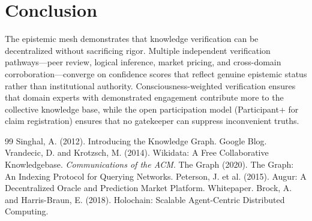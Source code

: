 \documentclass[11pt,twocolumn]{article}
\begin{document}
\section{Conclusion}

The epistemic mesh demonstrates that knowledge verification can be
decentralized without sacrificing rigor. Multiple independent verification
pathways---peer review, logical inference, market pricing, and cross-domain
corroboration---converge on confidence scores that reflect genuine epistemic
status rather than institutional authority. Consciousness-weighted verification
ensures that domain experts with demonstrated engagement contribute more to
the collective knowledge base, while the open participation model (Participant+
for claim registration) ensures that no gatekeeper can suppress inconvenient
truths.

\begin{thebibliography}{99}
   Singhal, A. (2012). Introducing the Knowledge Graph.
    Google Blog.
   Vrandecic, D. and Krotzsch, M. (2014). Wikidata:
    A Free Collaborative Knowledgebase. \textit{Communications of the ACM}.
   The Graph (2020). The Graph: An Indexing Protocol
    for Querying Networks.
   Peterson, J. et al. (2015). Augur: A Decentralized
    Oracle and Prediction Market Platform. Whitepaper.
   Brock, A. and Harris-Braun, E. (2018). Holochain:
    Scalable Agent-Centric Distributed Computing.
\end{thebibliography}
\end{document}
